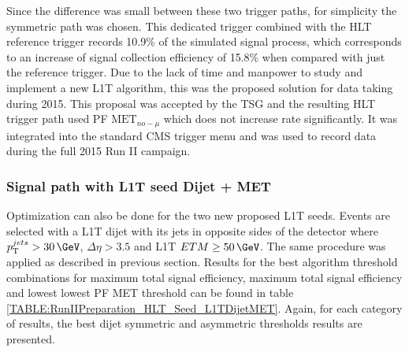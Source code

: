 Since the difference was small between these two trigger paths, for simplicity the symmetric path was chosen. This dedicated trigger combined with the \gls{HLT} reference trigger records 10.9\% of the simulated signal process, which corresponds to an increase of signal collection efficiency of 15.8\% when compared with just the reference trigger. Due to the lack of time and manpower to study and implement a new \gls{L1T} algorithm, this was the proposed solution for data taking during 2015. This proposal was accepted by the \gls{TSG} and the resulting \gls{HLT} trigger path used \gls{PF} $\text{MET}_{no-\mu}$ which does not increase rate significantly. It was integrated into the standard \gls{CMS} trigger menu and was used to record data during the full 2015 Run II campaign.

\subsubsection{Signal path with L1T seed Dijet + MET}
\label{SECTION:RunIITriggerStudies_HLTAlgorithmDevelopment_L1TDijetMET}


Optimization can also be done for the two new proposed \gls{L1T} seeds. Events are selected with a \gls{L1T} dijet with its jets in opposite sides of the detector where $\pt^{jets}>30\,\GeV$, $\Delta\eta>3.5$ and \gls{L1T} $ETM \geq 50\,\GeV$. The same procedure was applied as described in previous section. Results for the best algorithm threshold combinations for maximum total signal efficiency, maximum total signal efficiency and lowest lowest \gls{PF} \gls{MET} threshold can be found in table \ref{TABLE:RunIIPreparation_HLT_Seed_L1TDijetMET}. Again, for each category of results, the best dijet symmetric and asymmetric \pt thresholds results are presented.

